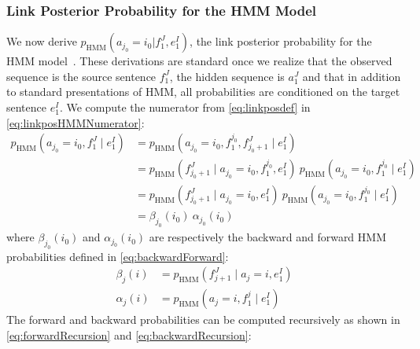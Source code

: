 \subsubsection{Link Posterior Probability for the HMM Model}
\label{sec:linkPosteriorHMM}
We now derive $p_{\text{HMM}}(a_{j_0} = i_0 | f_1^J, e_1^I)$, the link posterior
probability for the HMM
model~\citep{vogel-ney-tillmann,rabiner:1989:IEEE}. These derivations
are standard once we realize that the observed sequence is the source
sentence $f_1^J$, the hidden sequence is $a_1^J$ and that in addition
to standard presentations of HMM, all probabilities are conditioned on
the target sentence $e_1^I$.
We compute the numerator from \autoref{eq:linkposdef} in
\autoref{eq:linkposHMMNumerator}:
%
\begin{align}
  p_{\text{HMM}}(a_{j_0} = i_0, f_1^J \mid e_1^I) &= p_{\text{HMM}}(a_{j_0} = i_0, f_1^{j_0}, f_{j_0 + 1}^J \mid e_1^I) \nonumber \\
                                               &= p_{\text{HMM}}(f_{j_0 + 1}^J \mid a_{j_0} = i_0, f_1^{j_0}, e_1^I) \ p_{\text{HMM}}(a_{j_0} = i_0, f_1^{j_0} \mid e_1^I) \nonumber \\
                                               &= p_{\text{HMM}}(f_{j_0 + 1}^J \mid a_{j_0} = i_0, e_1^I) \ p_{\text{HMM}}(a_{j_0} = i_0, f_1^{j_0} \mid e_1^I) \nonumber \\
                                               &= \beta_{j_0}(i_0) \ \alpha_{j_0}(i_0) \label{eq:linkposHMMNumerator}
\end{align}
%
where $\beta_{j_0}(i_0)$ and $\alpha_{j_0}(i_0)$ are respectively
the backward and forward HMM probabilities defined in \autoref{eq:backwardForward}:
%
\begin{equation}
  \begin{split}
    \beta_{j}(i)  &= p_{\text{HMM}}(f_{j + 1}^J \mid a_{j} = i, e_1^I) \\
    \alpha_{j}(i) &= p_{\text{HMM}}(a_{j} = i, f_1^{j} \mid e_1^I)
  \end{split}
  \label{eq:backwardForward}
\end{equation}
%
The forward and backward probabilities can be computed recursively as
shown in \autoref{eq:forwardRecursion} and \autoref{eq:backwardRecursion}:
%
